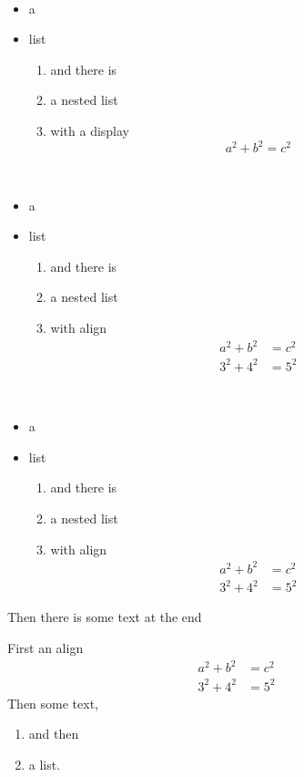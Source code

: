 \begin{note}\ 
  \begin{itemize}
  \item a
  \item list
    \begin{enumerate}
    \item and there is
    \item a nested list
    \item with a display
      \[
        a^2 + b^2 = c^2
      \]
    \end{enumerate}
  \end{itemize}
\end{note}
\begin{note}\ 
  \begin{itemize}
  \item a
  \item list
    \begin{enumerate}
    \item and there is
    \item a nested list
    \item with align
      \begin{align}
        a^2 + b^2 & = c^2\\
        3^2 + 4^2 & = 5^2
      \end{align}
    \end{enumerate}
  \end{itemize}
\end{note}
\begin{note}\ 
  \begin{itemize}
  \item a
  \item list
    \begin{enumerate}
    \item and there is
    \item a nested list
    \item with align
      \begin{align}
        a^2 + b^2 & = c^2\\
        3^2 + 4^2 & = 5^2
      \end{align}
    \end{enumerate}
  \end{itemize}
  Then there is some text at the end
\end{note}
\begin{note}
  First an align
  \begin{align}
    a^2 + b^2 & = c^2\\
    3^2 + 4^2 & = 5^2
  \end{align}
  Then some text,
  \begin{enumerate}
  \item and then
  \item a list.
  \end{enumerate}
\end{note}


